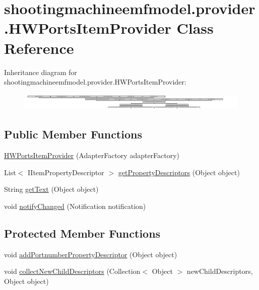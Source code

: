 \hypertarget{classshootingmachineemfmodel_1_1provider_1_1_h_w_ports_item_provider}{\section{shootingmachineemfmodel.\-provider.\-H\-W\-Ports\-Item\-Provider Class Reference}
\label{classshootingmachineemfmodel_1_1provider_1_1_h_w_ports_item_provider}
}
Inheritance diagram for shootingmachineemfmodel.\-provider.\-H\-W\-Ports\-Item\-Provider\-:\begin{figure}[H]
\begin{center}
\leavevmode
\includegraphics[height=0.831848cm]{classshootingmachineemfmodel_1_1provider_1_1_h_w_ports_item_provider}
\end{center}
\end{figure}
\subsection*{Public Member Functions}
\begin{DoxyCompactItemize}
\item 
\hyperlink{classshootingmachineemfmodel_1_1provider_1_1_h_w_ports_item_provider_a61f6a05cef17a6965a93e7b5a36212d2}{H\-W\-Ports\-Item\-Provider} (Adapter\-Factory adapter\-Factory)
\item 
List$<$ I\-Item\-Property\-Descriptor $>$ \hyperlink{classshootingmachineemfmodel_1_1provider_1_1_h_w_ports_item_provider_ab089d182011acdb769fb3aebff1ba7de}{get\-Property\-Descriptors} (Object object)
\item 
String \hyperlink{classshootingmachineemfmodel_1_1provider_1_1_h_w_ports_item_provider_ab3ced495ea197f510ade3b1a20914bb9}{get\-Text} (Object object)
\item 
void \hyperlink{classshootingmachineemfmodel_1_1provider_1_1_h_w_ports_item_provider_a1c65189f145315686aa267a1c0490821}{notify\-Changed} (Notification notification)
\end{DoxyCompactItemize}
\subsection*{Protected Member Functions}
\begin{DoxyCompactItemize}
\item 
void \hyperlink{classshootingmachineemfmodel_1_1provider_1_1_h_w_ports_item_provider_a854c3c112de885b249e637226f1c02d4}{add\-Portnumber\-Property\-Descriptor} (Object object)
\item 
void \hyperlink{classshootingmachineemfmodel_1_1provider_1_1_h_w_ports_item_provider_a6fcc4ee601c2d4ef1e660c91cc8b6e80}{collect\-New\-Child\-Descriptors} (Collection$<$ Object $>$ new\-Child\-Descriptors, Object object)
\end{DoxyCompactItemize}


